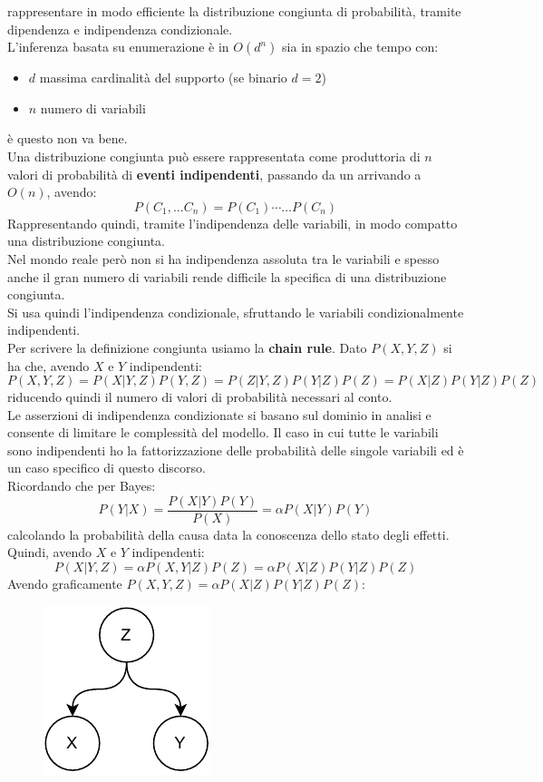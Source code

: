\message{ !name(modprob.tex)}\documentclass[a4paper,12pt, oneside]{book}
\begin{document}
rappresentare in modo efficiente la distribuzione congiunta di probabilità,
tramite dipendenza e indipendenza condizionale.\\
L'inferenza basata su enumerazione è in $O(d^n)$ sia in spazio che tempo con:
\begin{itemize}
  \item $d$ massima cardinalità del supporto (se binario $d=2$)
  \item $n$ numero di variabili
\end{itemize}
è questo non va bene.\\
Una distribuzione congiunta può essere rappresentata come produttoria di $n$
valori di probabilità di \textbf{eventi indipendenti}, passando da un arrivando
a $O(n)$, avendo:
\[P(C_1,\ldots C_n)=P(C_1)\cdots \ldots P(C_n)\]
Rappresentando quindi, tramite l'indipendenza delle variabili, in modo compatto
una distribuzione congiunta. \\
Nel mondo reale però non si ha indipendenza assoluta tra le variabili e spesso
anche il gran numero di variabili rende difficile la specifica di una
distribuzione congiunta. \\
Si usa quindi l'indipendenza condizionale, sfruttando le variabili
condizionalmente indipendenti. \\
Per scrivere la definizione congiunta usiamo la \textbf{chain rule}.
Dato $P(X,Y,Z)$ si ha che, avendo $X$ e $Y$ indipendenti:
\[P(X,Y,Z)=P(X|Y,Z)P(Y,Z)=P(Z|Y,Z)P(Y|Z)P(Z)=P(X|Z)P(Y|Z)P(Z)\]
riducendo quindi il numero di valori di probabilità necessari al conto.\\
Le asserzioni di indipendenza condizionate si basano sul dominio in analisi e
consente di limitare le complessità del modello. Il caso in cui tutte le
variabili sono indipendenti ho la fattorizzazione delle probabilità delle
singole variabili ed è un caso specifico di questo discorso.\\
Ricordando che per Bayes:
\[P(Y|X)=\frac{P(X|Y)P(Y)}{P(X)}=\alpha P(X|Y)P(Y)\]
calcolando la probabilità della causa data la conoscenza dello stato degli
effetti. Quindi, avendo $X$ e $Y$ indipendenti:
\[P(X|Y,Z)=\alpha P(X,Y|Z)P(Z)=\alpha P(X|Z)P(Y|Z)P(Z)\]
Avendo graficamente $P(X,Y,Z)=\alpha P(X|Z)P(Y|Z)P(Z)$:
\begin{figure}[H]
  \centering
  \includegraphics[scale = 0.9]{img/b2.pdf}
\end{figure}
\end{document}
